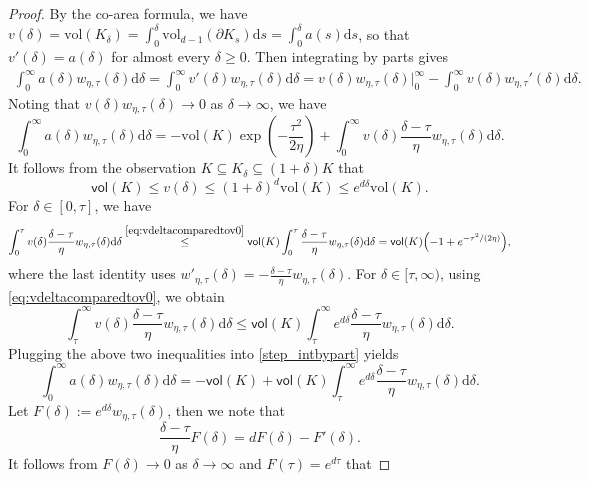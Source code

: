 \documentclass[10pt,a4paper]{amsart}
\newcommand{\D}{\mathrm{d}}
\newcommand{\vol}{\mathsf{vol}}
\begin{document}
\begin{proof}
By the co-area formula, we have $v(\delta) = \mathrm{vol}(K_\delta) = \int_0^{\delta} \mathrm{vol}_{d-1}(\partial K_s) \D s = \int_0^{\delta} a(s) \D s$, so that  $v'(\delta)=a(\delta)$ for almost every $\delta\ge 0$. Then integrating by parts gives
\begin{align}
\label{intbypart}
 \int_0^\infty a(\delta) w_{\eta,\tau}(\delta)  \D \delta=  \int_0^\infty v'(\delta) w_{\eta,\tau}(\delta)  \D \delta
  =
  v(\delta)w_{\eta,\tau}(\delta)\bigg|_{0}^{\infty}
  - \int_0^\infty v(\delta) w_{\eta,\tau}'(\delta)  \D \delta.
\end{align}
Noting that $v(\delta)w_{\eta,\tau}(\delta)\to 0$ as $\delta\to\infty$, we have
\begin{equation}
\label{step_intbypart}
  \int_0^\infty a(\delta) w_{\eta,\tau}(\delta)  \D \delta
  =
  -\mathrm{vol} (K)\exp\!\left(-\frac{\tau^2}{2\eta}\right)
  + \int_0^\infty v(\delta) \frac{\delta-\tau}{\eta} w_{\eta,\tau}(\delta)  \D \delta.
\end{equation}
It follows from the observation $K\subseteq K_\delta\subseteq (1+\delta)K$ that
\begin{equation}
\label{eq:vdeltacomparedtov0}
  \vol(K)\le v(\delta)\le (1+\delta)^d \mathrm{vol} (K)\le e^{ d \delta} \mathrm{vol} (K).
\end{equation}
For $\delta \in [0,\tau]$, we have
\[
\int_0^\tau v(\delta)\frac{\delta-\tau}{\eta}w_{\eta,\tau}(\delta) \D\delta
\stackrel{\eqref{eq:vdeltacomparedtov0}}\le
\vol(K)\int_0^\tau \frac{\delta-\tau}{\eta}w_{\eta,\tau}(\delta) \D\delta
=
\vol(K)\Bigl(-1+e^{-\tau^2/(2\eta)}\Bigr),
\]
where the last identity uses $w'_{\eta,\tau}(\delta)=-\frac{\delta-\tau}{\eta}w_{\eta,\tau}(\delta)$.
For $\delta \in [\tau,\infty)$, using \eqref{eq:vdeltacomparedtov0}, we obtain
\[
\int_\tau^\infty v(\delta)\frac{\delta-\tau}{\eta}w_{\eta,\tau}(\delta) \D\delta
\le
\vol(K)\int_\tau^\infty e^{d\delta}\frac{\delta-\tau}{\eta}w_{\eta,\tau}(\delta) \D\delta.
\]
Plugging the above two inequalities into \eqref{step_intbypart} yields
\begin{equation}
\int_0^\infty a(\delta) w_{\eta,\tau}(\delta) \D\delta
=
-\vol(K)
+\vol(K)\int_\tau^\infty e^{d\delta}\frac{\delta-\tau}{\eta}w_{\eta,\tau}(\delta) \D\delta.
\label{step_intbypart_split}
\end{equation}
Let $F(\delta):=e^{d\delta}w_{\eta,\tau}(\delta)$, then we note that
\[
  \frac{\delta-\tau}{\eta}F(\delta)=dF(\delta)-F'(\delta).
\]
It follows from $F(\delta)\to 0$ as $\delta\to\infty$ and $F(\tau)=e^{d\tau}$ that

\end{proof}
\end{document}
